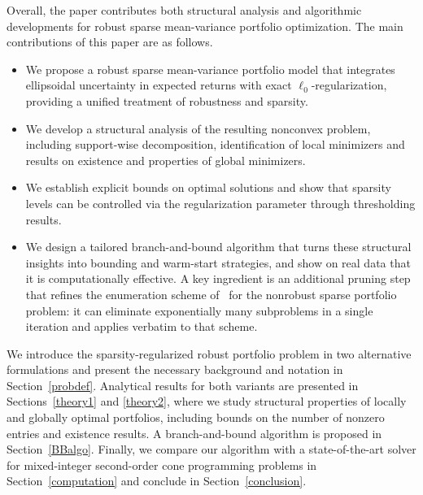 \documentclass[11pt]{article}
\theoremstyle{plain}
\theoremstyle{definition}
\theoremstyle{plain}
\begin{document}
Overall, the paper contributes both structural analysis and algorithmic developments for robust sparse mean-variance portfolio optimization. The main contributions of this paper are as follows.
\begin{itemize}
\item We propose a robust sparse mean-variance portfolio model that integrates ellipsoidal uncertainty in expected returns with exact $\ell_0$-regularization, providing a unified treatment of robustness and sparsity.
\item We develop a structural analysis of the resulting nonconvex problem, including support-wise decomposition, identification of local minimizers and results on existence and properties of global minimizers.
\item We establish explicit bounds on optimal solutions and show that sparsity levels can be controlled via the regularization parameter through thresholding results.
\item We design a tailored branch-and-bound algorithm that turns these structural insights into bounding and warm-start strategies, and show on real data that it is computationally effective. A key ingredient is an additional pruning step that refines the enumeration scheme of~\cite{SenAkkayaPinar2025} for the nonrobust sparse portfolio problem: it can eliminate exponentially many subproblems in a single iteration and applies verbatim to that scheme.
\end{itemize}
We introduce the sparsity-regularized robust portfolio problem in two alternative formulations and present the necessary background and notation in Section~\ref{probdef}. Analytical results for both variants are presented in Sections~\ref{theory1} and \ref{theory2}, where we study structural properties of locally and globally optimal portfolios, including bounds on the number of nonzero entries and existence results. A branch-and-bound algorithm is proposed in Section~\ref{BBalgo}. Finally, we compare our algorithm with a state-of-the-art solver for mixed-integer second-order cone programming problems in Section~\ref{computation} and conclude in Section~\ref{conclusion}.
\end{document}
